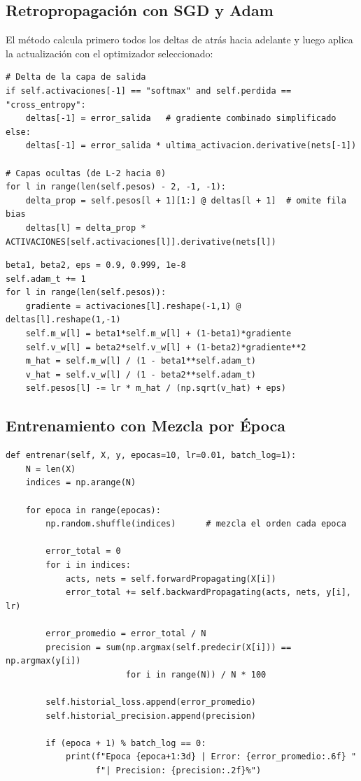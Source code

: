 \subsection{Retropropagación con SGD y Adam}

El método calcula primero todos los deltas de atrás hacia adelante y luego aplica la
actualización con el optimizador seleccionado:

\begin{lstlisting}[style=python, caption={backwardPropagating — cálculo de deltas}]
# Delta de la capa de salida
if self.activaciones[-1] == "softmax" and self.perdida == "cross_entropy":
    deltas[-1] = error_salida   # gradiente combinado simplificado
else:
    deltas[-1] = error_salida * ultima_activacion.derivative(nets[-1])

# Capas ocultas (de L-2 hacia 0)
for l in range(len(self.pesos) - 2, -1, -1):
    delta_prop = self.pesos[l + 1][1:] @ deltas[l + 1]  # omite fila bias
    deltas[l] = delta_prop * ACTIVACIONES[self.activaciones[l]].derivative(nets[l])
\end{lstlisting}

\begin{lstlisting}[style=python, caption={Actualización Adam}]
beta1, beta2, eps = 0.9, 0.999, 1e-8
self.adam_t += 1
for l in range(len(self.pesos)):
    gradiente = activaciones[l].reshape(-1,1) @ deltas[l].reshape(1,-1)
    self.m_w[l] = beta1*self.m_w[l] + (1-beta1)*gradiente
    self.v_w[l] = beta2*self.v_w[l] + (1-beta2)*gradiente**2
    m_hat = self.m_w[l] / (1 - beta1**self.adam_t)
    v_hat = self.v_w[l] / (1 - beta2**self.adam_t)
    self.pesos[l] -= lr * m_hat / (np.sqrt(v_hat) + eps)
\end{lstlisting}

\subsection{Entrenamiento con Mezcla por Época}

\begin{lstlisting}[style=python, caption={entrenar con shuffle y batch\_log}]
def entrenar(self, X, y, epocas=10, lr=0.01, batch_log=1):
    N = len(X)
    indices = np.arange(N)

    for epoca in range(epocas):
        np.random.shuffle(indices)      # mezcla el orden cada epoca

        error_total = 0
        for i in indices:
            acts, nets = self.forwardPropagating(X[i])
            error_total += self.backwardPropagating(acts, nets, y[i], lr)

        error_promedio = error_total / N
        precision = sum(np.argmax(self.predecir(X[i])) == np.argmax(y[i])
                        for i in range(N)) / N * 100

        self.historial_loss.append(error_promedio)
        self.historial_precision.append(precision)

        if (epoca + 1) % batch_log == 0:
            print(f"Epoca {epoca+1:3d} | Error: {error_promedio:.6f} "
                  f"| Precision: {precision:.2f}%")
\end{lstlisting}

